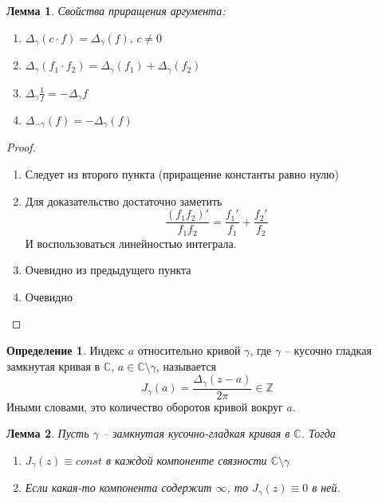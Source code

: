 \documentclass[a4paper,12pt]{article}
\theoremstyle{plain}
\newtheorem{lemma}{Лемма}[section]
\theoremstyle{definition}
\newtheorem{definition}{Определение}[section]
\theoremstyle{remark}
\begin{document}
\begin{lemma}
	Свойства приращения аргумента:
	\begin{enumerate}
		\item $\Delta_\gamma(c\cdot f) = \Delta_\gamma(f),\, c \neq 0$
		\item $\Delta_\gamma(f_1\cdot f_2) = \Delta_\gamma(f_1) + \Delta_\gamma(f_2)$
		\item $\Delta_\gamma\frac{1}{f} = -\Delta_\gamma f$
		\item $\Delta_{-\gamma}(f) = -\Delta_\gamma(f)$
	\end{enumerate}
\end{lemma}

\begin{proof}
	\begin{enumerate}
		\item Следует из второго пункта (приращение константы равно нулю)
		\item Для доказательство достаточно заметить
		      \[
			      \frac{(f_1f_2)'}{f_1f_2} = \frac{f_1'}{f_1} +
			      \frac{f_2'}{f_2}
		      \]
		      И воспользоваться линейностью интеграла.
		\item Очевидно из предыдущего пункта
		\item Очевидно
	\end{enumerate}
\end{proof}

\begin{definition}
	Индекс $a$ относительно кривой $\gamma$, где $\gamma$ -- кусочно гладкая замкнутая кривая в $\mathbb{C},\, a \in \mathbb{C} \setminus \gamma$, называется
	\[
		J_\gamma(a) = \frac{\Delta_\gamma(z - a)}{2\pi} \in \mathbb{Z}
	\]
	Иными словами, это количество оборотов кривой вокруг $a$.
\end{definition}

\begin{lemma}
	Пусть $\gamma$ -- замкнутая кусочно-гладкая кривая в $\mathbb{C}$. Тогда
	\begin{enumerate}
		\item $J_\gamma(z) \equiv const$ в каждой компоненте связности $\mathbb{C}\setminus\gamma$
		\item Если какая-то компонента содержит $\infty$, то $J_\gamma(z) \equiv 0$ в ней.
	\end{enumerate}
\end{lemma}
\end{document}
